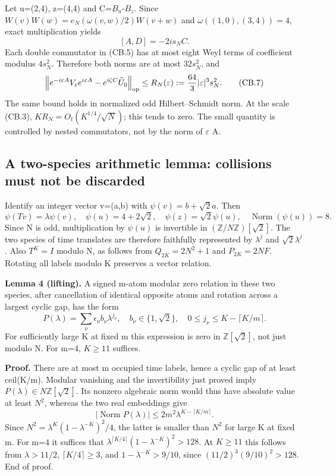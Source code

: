 Let u=(2,4), z=(4,4) and C=\(B_{u}\)-\(B_{z}\). Since \(W(v)W(w)=e_N(\omega(v,w)/2)W(v+w)\) and \(\omega((1,0),(3,4))=4\), exact multiplication yields \[
 [A,D]=-2i s_N C.                                             \tag{CB.6}
\] Each double commutator in (CB.5) has at most eight Weyl terms of coefficient modulus \(4s_N^2\). Therefore both norms are at most \(32s_N^2\), and \[
 \left\|e^{-i\varepsilon A}V_\varepsilon e^{i\varepsilon A}
                  -e^{i\zeta C}\widetilde U_0\right\|_{\rm op}
 \leq R_N(\varepsilon):=\frac{64}{3}|\varepsilon|^3s_N^2.        \tag{CB.7}
\] The same bound holds in normalized odd Hilbert--Schmidt norm. At the scale (CB.3), \(KR_N=O_t(K^{1/4}/\sqrt N)\); this tends to zero. The small quantity is controlled by nested commutators, not by the norm of \(\varepsilon\) A.

\subsection{A two-species arithmetic lemma: collisions must not be discarded}\label{coboundary:a-two-species-arithmetic-lemma-collisions-must-not-be-discarded}

Identify an integer vector v=(a,b) with \(\psi(v)=b+\sqrt2 a\). Then \[
 \psi(Tv)=\lambda\psi(v),\quad
 \psi(u)=4+2\sqrt2,\quad \psi(z)=\sqrt2\psi(u),\quad
 \operatorname{Norm}(\psi(u))=8.
\] Since N is odd, multiplication by \(\psi(u)\) is invertible in \((\mathbb Z/N\mathbb Z)[\sqrt2]\). The two species of time translates are therefore faithfully represented by \(\lambda^j\) and \(\sqrt2\lambda^j\). Also \(T^K=I\) modulo N, as follows from \(Q_{2K}=2N^2+1\) and \(P_{2K}=2NF\). Rotating all labels modulo K preserves a vector relation.

\textbf{Lemma 4 (lifting).} A signed m-atom modular zero relation in these two species, after cancellation of identical opposite atoms and rotation across a largest cyclic gap, has the form \[
 P(\lambda)=\sum_\nu \epsilon_\nu b_\nu\lambda^{j_\nu},
 \quad b_\nu\in\{1,\sqrt2\},\quad
 0\leq j_\nu\leq K-\lceil K/m\rceil.
\] For sufficiently large K at fixed m this expression is zero in \(\mathbb Z[\sqrt2]\), not just modulo N. For m=4, \(K\geq11\) suffices.

\textbf{Proof.} There are at most m occupied time labels, hence a cyclic gap of at least ceil(K/m). Modular vanishing and the invertibility just proved imply \(P(\lambda)\in N\mathbb Z[\sqrt2]\). Its nonzero algebraic norm would thus have absolute value at least \(N^2\), whereas the two real embeddings give \[
 |\operatorname{Norm}P(\lambda)|
 \leq2m^2\lambda^{K-\lceil K/m\rceil}.
\] Since \(N^2=\lambda^K(1-\lambda^{-K})^2/4\), the latter is smaller than \(N^2\) for large K at fixed m. For m=4 it suffices that \(\lambda^{\lceil K/4\rceil}(1-\lambda^{-K})^2>128\). At \(K\geq11\) this follows from \(\lambda>11/2\), \(\lceil K/4\rceil\geq3\), and \(1-\lambda^{-K}>9/10\), since \((11/2)^3(9/10)^2>128\). End of proof.

